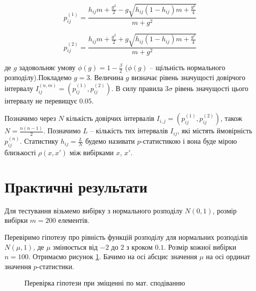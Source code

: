 \documentclass[a4paper,12pt]{article}
\begin{document}
\[
	p_{ij}^{(1)} = \frac{h_{ij}m + \frac{g^2}{2} - g \sqrt{h_{ij}(1 - h_{ij})m + \frac{g^2}{4}}}{m + g^2}
\]

\[
	p_{ij}^{(2)} = \frac{h_{ij}m + \frac{g^2}{2} + g \sqrt{h_{ij}(1 - h_{ij})m + \frac{g^2}{4}}}{m + g^2}
\]

де $g$ задовольняє умову $\phi(g) = 1 - \frac{\beta}{2}$ ($\phi(g)$ -- щільність нормального розподілу).Покладемо $g =3$. Величина $g$ визначає рівень значущості довірчого інтервалу  $I^{(n,m)}_{ij} = (p_{ij}^{(1)},p_{ij}^{(2)})$. В силу правила $3 \sigma$ рівень значущості цього інтервалу не перевищує $0.05$. 

Позначимо через $N$ кількість довірчих інтервалів $I_{i,j} = (p_{ij}^{(1)},p_{ij}^{(2)})$, також $N = \frac{n(n-1)}{2}$. Позначимо $L$ -- кількість тих інтервалів $I_{ij}$, які містять ймовірність $p_{ij}^{(n)}$. Статистику $h_{ij} = \frac{L}{N}$ будемо називати $p$-статистикою і вона буде мірою близькості $\rho(x,x')$ між вибірками $x$, $x'$.


\section{Практичні результати}

Для тестування візьмемо вибірку з нормального розподілу $N(0,1)$, розмір вибірки $m = 200$ елементів. 

Перевіримо гіпотезу про рівність функцій розподілу для нормальних розподілів $N(\mu, 1)$, де $\mu$ змінюється від $-2$ до $2$ з кроком $0.1$. Розмір кожної вибірки $n =100$. Отримаємо рисунок \ref{fig:f1}. Бачимо на осі абсцис значення $\mu$ на осі ординат значення $p$-статистики.

\newpage
\begin{figure}[ht]
	\caption{Перевірка гіпотези при зміщенні по мат. сподіванню}
	\label{fig:f1}
\end{figure}
\end{document}
